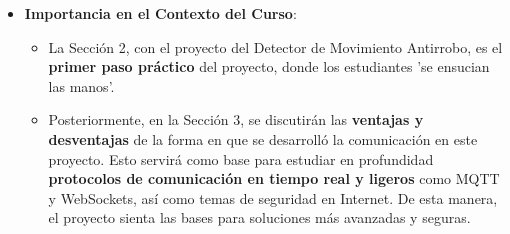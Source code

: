 \documentclass{report}
\begin{document}
\begin{itemize}
    \item \textbf{Importancia en el Contexto del Curso}:
    \begin{itemize}
        \item La Sección 2, con el proyecto del Detector de Movimiento Antirrobo, es el \textbf{primer paso práctico} del proyecto, donde los estudiantes  
        'se ensucian las manos'.
        \item Posteriormente, en la Sección 3, se discutirán las \textbf{ventajas y desventajas} de la forma en que se desarrolló la comunicación en este 
        proyecto. Esto servirá como base para estudiar en profundidad \textbf{protocolos de comunicación en tiempo real y ligeros} como MQTT y WebSockets, 
        así como temas de seguridad en Internet. De esta manera, el proyecto sienta las bases para soluciones más avanzadas y seguras.
    \end{itemize}
\end{itemize}
\end{document}
